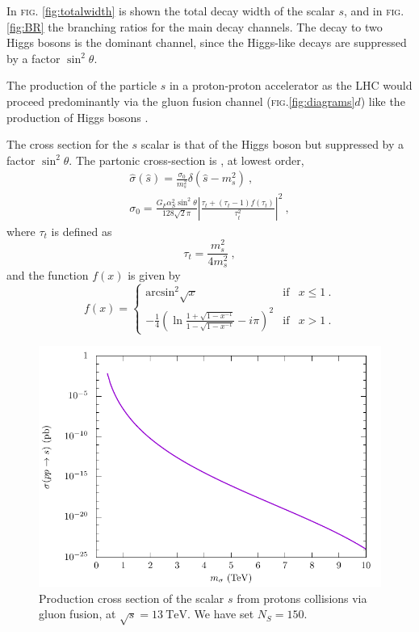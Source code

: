 \documentclass[aps,prd,preprintnumbers,nofootinbibn,twocolumn]{revtex4}
\begin{document}
In \textsc{fig.} \ref{fig:totalwidth} is shown the total decay width of the scalar $s$, and in \textsc{fig.} \ref{fig:BR} the branching ratios for the main decay channels. The decay to two Higgs bosons is the dominant channel, since the Higgs-like decays are suppressed by a factor $\sin^2\theta$.


The production of the particle $s$ in a proton-proton accelerator as the LHC would proceed predominantly via the gluon fusion channel (\textsc{fig.}\ref{fig:diagrams}$d$) like the production of Higgs bosons \cite{Dittmaier:2011ti}. 

The cross section for the $s$ scalar is that of the Higgs boson but suppressed by a factor $\sin^2\theta$. The partonic cross-section is \cite{Spira:1995rr}, at lowest order, 
\begin{align}
\hat{\sigma}(\hat{s}) = \frac{\sigma_0}{m_s^2}\delta(\hat{s}-m_s^2)\ ,\nonumber\\
\sigma_0 = \frac{G_F \alpha_S^2 \sin^2 \theta}{128\sqrt{2} \pi} \left|\frac{\tau_t + (\tau_t-1)f(\tau_t)}{\tau_t^2}  \right|^2\ ,
\end{align}
where $\tau_t$ is defined as
\begin{equation}
\tau_t =  \frac{m_s^2}{4m_s^2}\ ,
\end{equation}
and the function $f(x)$ is given by
\begin{equation}
f(x)= \left\{ \begin{array}{lcc}
\mathrm{arcsin}^2 \sqrt{x} & \mathrm{if} & x \leq 1\ .\\
-\frac{1}{4}\left(\ln \frac{1+\sqrt{1-x^{-1}}}{1-\sqrt{1-x^{-1}}}-i\pi\right)^2 & \mathrm{if} & x>1\ .
\end{array} \right.
\end{equation}

\begin{figure}[t]
\centering
\includegraphics[width=\columnwidth]{crossec}
\caption{Production cross section of the scalar $s$ from protons collisions via gluon fusion, at $\sqrt{s} = \SI{13}{\tera\electronvolt}$. We have set $N_S=150$.}\label{fig:crossect}
\end{figure}
\end{document}
